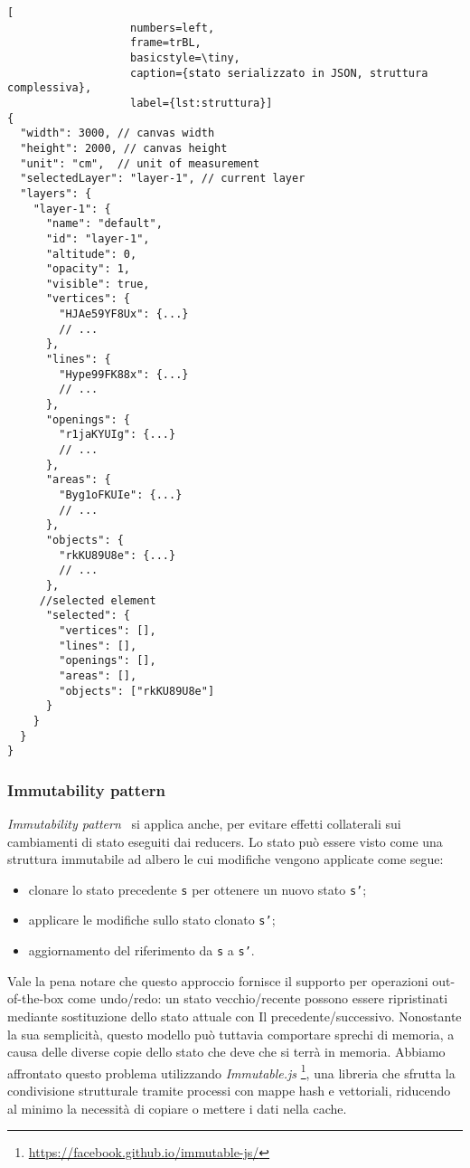 \begin{lstlisting}[
                   numbers=left,
                   frame=trBL,
                   basicstyle=\tiny,
                   caption={stato serializzato in JSON, struttura complessiva},
                   label={lst:struttura}]
{
  "width": 3000, // canvas width
  "height": 2000, // canvas height
  "unit": "cm",  // unit of measurement
  "selectedLayer": "layer-1", // current layer
  "layers": {
    "layer-1": {
      "name": "default",
      "id": "layer-1",
      "altitude": 0,
      "opacity": 1,
      "visible": true,
      "vertices": {
        "HJAe59YF8Ux": {...}
        // ...
      },
      "lines": {
        "Hype99FK88x": {...}
        // ...
      },
      "openings": {
        "r1jaKYUIg": {...}
        // ...
      },
      "areas": {
        "Byg1oFKUIe": {...}
        // ...
      },
      "objects": {
        "rkKU89U8e": {...}
        // ...
      },
     //selected element
      "selected": {
        "vertices": [],
        "lines": [],
        "openings": [],
        "areas": [],
        "objects": ["rkKU89U8e"]
      }
    }
  }
}
\end{lstlisting}
\newpage

\subsubsection*{Immutability pattern}

\emph{Immutability pattern}~\cite{immutability} si applica anche, per evitare effetti collaterali sui cambiamenti di stato
eseguiti dai reducers. Lo stato può essere visto come una struttura immutabile ad albero le cui modifiche vengono applicate come segue:
\begin{itemize}
  \item clonare lo stato precedente \texttt{s} per ottenere un nuovo stato \texttt{s'};
  \item applicare le modifiche sullo stato clonato \texttt{s'};
  \item aggiornamento del riferimento da \texttt{s} a \texttt{s'}.
\end{itemize}
Vale la pena notare che questo approccio fornisce il supporto per operazioni out-of-the-box come undo/redo:
un stato vecchio/recente possono essere ripristinati mediante sostituzione dello stato attuale con Il precedente/successivo.
Nonostante la sua semplicità, questo modello può tuttavia comportare sprechi di memoria, a causa delle diverse copie dello
stato che deve che si terrà in memoria. Abbiamo affrontato questo problema utilizzando \emph{Immutable.js}
\footnote{\url{https://facebook.github.io/immutable-js/}}, una libreria che sfrutta la condivisione strutturale tramite
processi con mappe hash e vettoriali, riducendo al minimo la necessità di copiare o mettere i dati nella cache.
\newpage

